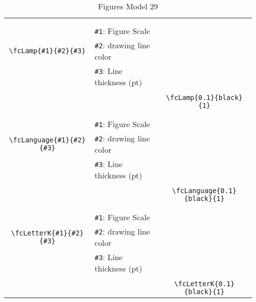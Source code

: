 \documentclass[x11names]{article}
\begin{document}
\begin{table}[H]
\begin{tabular}{|c|l|c|}
	&&\multirow{5}{*}{\fcLamp{0.1}{black}{1}}\\	&&\\	&\verb|#1|: Figure Scale &\\	\verb|\fcLamp{#1}{#2}{#3}|&	\verb|#2|: drawing line color &\\	&\verb|#3|: Line thickness (pt) &\\ &&\\&&	\verb|\fcLamp{0.1}{black}{1}|\\\hline 	
	&&\multirow{5}{*}{\fcLanguage{0.1}{black}{1}}\\	&&\\	&\verb|#1|: Figure Scale &\\	\verb|\fcLanguage{#1}{#2}{#3}|&	\verb|#2|: drawing line color &\\	&\verb|#3|: Line thickness (pt) &\\ &&\\&&	\verb|\fcLanguage{0.1}{black}{1}|\\\hline 	
	&&\multirow{5}{*}{\fcLetterK{0.1}{black}{1}}\\	&&\\	&\verb|#1|: Figure Scale &\\	\verb|\fcLetterK{#1}{#2}{#3}|&	\verb|#2|: drawing line color &\\	&\verb|#3|: Line thickness (pt) &\\ &&\\&&	\verb|\fcLetterK{0.1}{black}{1}|\\\hline 	\hline\end{tabular}\caption{Figures Model 29}\label{tab29}\end{table}
\end{document}
